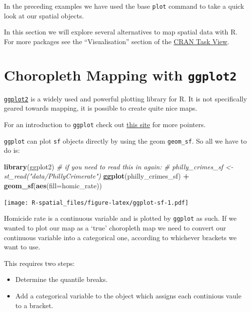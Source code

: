 \documentclass[
]{book}
\newenvironment{Shaded}{\begin{snugshade}}{\end{snugshade}}
\newcommand{\AttributeTok}[1]{\textcolor[rgb]{0.13,0.29,0.53}{#1}}
\newcommand{\CommentTok}[1]{\textcolor[rgb]{0.56,0.35,0.01}{\textit{#1}}}
\newcommand{\FunctionTok}[1]{\textcolor[rgb]{0.13,0.29,0.53}{\textbf{#1}}}
\newcommand{\NormalTok}[1]{#1}
\newcommand{\SpecialCharTok}[1]{\textcolor[rgb]{0.81,0.36,0.00}{\textbf{#1}}}
\providecommand{\tightlist}{%
  \setlength{\itemsep}{0pt}\setlength{\parskip}{0pt}}
\begin{document}
In the preceding examples we have used the base \texttt{plot} command to take a quick look at our spatial objects.

In this section we will explore several alternatives to map spatial data with R. For more packages see the ``Visualisation'' section of the \href{https://cran.r-project.org/web/views/Spatial.html}{CRAN Task View}.

\hypertarget{choropleth-mapping-with-ggplot2}{%
\section{\texorpdfstring{Choropleth Mapping with \texttt{ggplot2}}{Choropleth Mapping with ggplot2}}\label{choropleth-mapping-with-ggplot2}}

\href{http://ggplot2.org/}{\texttt{ggplot2}} is a widely used and powerful plotting library for R. It is not specifically geared towards mapping, it is possible to create quite nice maps.

For an introduction to \texttt{ggplot} check out \href{http://ggplot2.tidyverse.org/}{this site} for more pointers.

\texttt{ggplot} can plot \texttt{sf} objects directly by using the geom \texttt{geom\_sf}. So all we have to do is:

\begin{Shaded}
\begin{Highlighting}[]
\FunctionTok{library}\NormalTok{(ggplot2)}
\CommentTok{\# if you need to read this in again:}
\CommentTok{\# philly\_crimes\_sf \textless{}{-} st\_read("data/PhillyCrimerate") }
\FunctionTok{ggplot}\NormalTok{(philly\_crimes\_sf) }\SpecialCharTok{+} 
  \FunctionTok{geom\_sf}\NormalTok{(}\FunctionTok{aes}\NormalTok{(}\AttributeTok{fill=}\NormalTok{homic\_rate))}
\end{Highlighting}
\end{Shaded}

\texttt{[image: R-spatial\_files/figure-latex/ggplot-sf-1.pdf]}

Homicide rate is a continuous variable and is plotted by \texttt{ggplot} as such. If we wanted to plot our map as a `true' choropleth map we need to convert our continuous variable into a categorical one, according to whichever brackets we want to use.

This requires two steps:

\begin{itemize}
\tightlist
\item
  Determine the quantile breaks.
\item
  Add a categorical variable to the object which assigns each continious vaule to a bracket.
\end{itemize}
\end{document}
